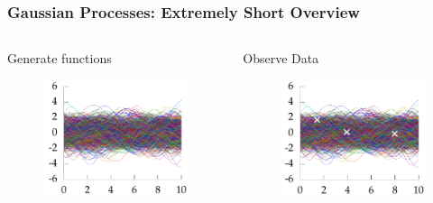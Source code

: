\documentclass[10pt]{beamer}
\begin{document}
  \begin{frame}
    \frametitle{Gaussian Processes: Extremely Short Overview}

    \begin{columns}
      \begin{column}{0.33\textwidth}
        Generate functions
        \begin{figure}
          \centering
          \includegraphics[width=\textwidth]{func1.png}
        \end{figure}
      \end{column}
      \pause
      \begin{column}{0.33\textwidth}
        Observe Data
        \begin{figure}
          \centering
          \includegraphics[width=\textwidth]{func2.png}

\end{figure}
\end{column}
\end{columns}
\end{frame}
\end{document}
